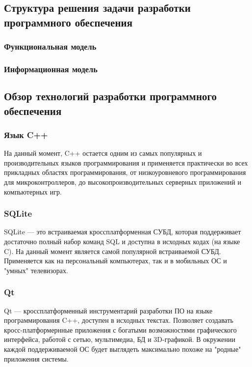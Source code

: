 
\subsection{Структура решения задачи разработки программного обеспечения}

\subsubsection{Функциональная  модель}

\subsubsection{Информационная модель}

\subsection{Обзор технологий разработки программного обеспечения}

\subsubsection{Язык C++}
На данный момент, C++ остается одним из самых популярных и производительных языков программирования и применяется практически во всех прикладных областях
программирования, от низкоуровневого программирования для микроконтроллеров, до высокопроизводительных серверных приложений и компьютерных игр.

\subsubsection{SQLite}
SQLite — это встраиваемая кроссплатформенная СУБД, которая поддерживает достаточно полный набор команд SQL и доступна в исходных кодах (на языке C). На данный
момент является самой популярной встраиваемой СУБД. Применяется как на персональный компьютерах, так и в мобильных ОС и "умных" телевизорах.

\subsubsection{Qt}
Qt — кроссплатформенный инструментарий разработки ПО на языке программирования C++, доступен в исходных текстах. Позволяет создавать кросс-платформернные приложения с богатыми возможностями
графического интерфейса, работой с сетью, мультимедиа, БД и 3D-графикой. В окружении каждой поддерживаемой ОС будет выглядеть максимально похоже на "родные" приложения
системы.

